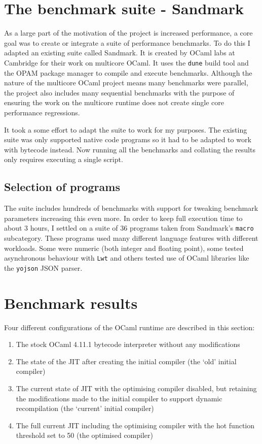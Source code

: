 \section{The benchmark suite - Sandmark}

As a large part of the motivation of the project is increased performance, a core goal was to
create or integrate a suite of performance benchmarks. To do this I adapted an existing suite
called Sandmark. It is created by OCaml labs at Cambridge for their work on
multicore OCaml. It uses the \texttt{dune} build tool and the OPAM package manager to compile and
execute benchmarks.
Although the nature of the multicore OCaml project means many benchmarks were parallel, the project
also includes many sequential benchmarks with the purpose of ensuring the work on the multicore
runtime does not create single core performance regressions.

It took a some effort to adapt the suite to work for my purposes. The existing suite was only
supported native code programs so it had to be adapted to work with bytecode instead. Now running
all the benchmarks and collating the results only requires executing a single script.

\subsection{Selection of programs}

The suite includes hundreds of benchmarks with support for tweaking benchmark parameters increasing
this even more. In order to keep full execution time to about 3 hours, I settled on a suite of 36
programs taken from Sandmark's \texttt{macro} subcategory. These programs used many different
language features with different workloads. Some were numeric (both integer and floating point),
some tested asynchronous behaviour with \texttt{Lwt} and others tested use of OCaml libraries like
the \texttt{yojson} JSON parser.

\section{Benchmark results}

Four different configurations of the OCaml runtime are described in this section:

\begin{enumerate}
      \item The stock OCaml 4.11.1 bytecode interpreter without any modifications
      \item The state of the JIT after creating the initial compiler (the `old' initial compiler)
      \item The current state of JIT with the optimising compiler disabled, but retaining
            the modifications made to the initial compiler to support dynamic recompilation (the
            `current' initial compiler)
      \item The full current JIT including the optimising compiler with the hot function threshold
            set to 50 (the optimised compiler)
\end{enumerate}

